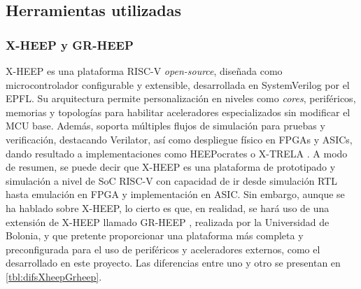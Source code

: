 \subsection{Herramientas utilizadas}

\subsubsection{X-HEEP y GR-HEEP}
\label{st:xheep}
\ac{X-HEEP} \cite{machetti2024xheep} \cite{xheepInfo} es una plataforma RISC-V \textit{open-source}, diseñada como microcontrolador configurable y extensible, desarrollada en SystemVerilog por el \ac{EPFL}. Su arquitectura permite personalización en niveles como \textit{cores}, periféricos, memorias y topologías para habilitar aceleradores especializados sin modificar el \ac{MCU} base. Además, soporta múltiples flujos de simulación para pruebas y verificación, destacando Verilator, así como despliegue físico en FPGAs y ASICs, dando resultado a implementaciones como HEEPocrates o X-TRELA \cite{xheepInfoASIC}. A modo de resumen, se puede decir que X-HEEP es una plataforma de prototipado y simulación a nivel de \ac{SoC} RISC-V con capacidad de ir desde simulación RTL hasta emulación en FPGA y implementación en ASIC. Sin embargo, aunque se ha hablado sobre X-HEEP, lo cierto es que, en realidad, se hará uso de una extensión de X-HEEP llamado \ac{GR-HEEP} \cite{grheepInfo}, realizada por la Universidad de Bolonia, y que pretente proporcionar una plataforma más completa y preconfigurada para el uso de periféricos y aceleradores externos, como el desarrollado en este proyecto. Las diferencias entre uno y otro se presentan en \ref{tbl:difsXheepGrheep}.

